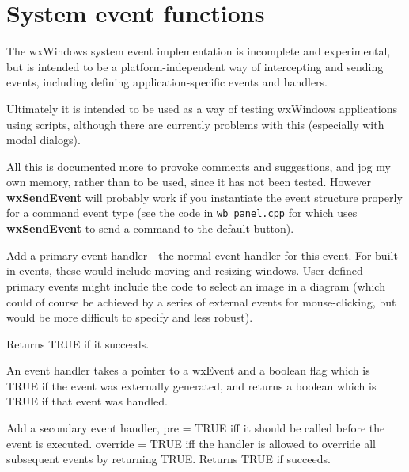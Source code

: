 \section{System event functions}

The wxWindows system event implementation is incomplete and
experimental, but is intended to be a platform-independent way of
intercepting and sending events, including defining
application-specific events and handlers.

Ultimately it is intended to be used as a way of testing wxWindows
applications using scripts, although there are currently
problems with this (especially with modal dialogs).

All this is documented more to provoke comments and suggestions, and
jog my own memory, rather than to be used, since it has not been
tested. However {\bf wxSendEvent} will probably work if you
instantiate the event structure properly for a command event type (see
the code in {\tt wb\_panel.cpp} for \rtfsp
which uses {\bf wxSendEvent} to send a command to the default button).



Add a primary event handler---the normal event handler for this
event. For built-in events, these would include moving and resizing
windows. User-defined primary events might include the code to
select an image in a diagram (which could of course be achieved by a series
of external events for mouse-clicking, but would be more difficult to specify
and less robust).

Returns TRUE if it succeeds.

An event handler takes a pointer to a wxEvent and a boolean flag which is
TRUE if the event was externally generated, and returns a boolean which is
TRUE if that event was handled.



Add a secondary event handler, pre = TRUE iff it should be called before the
event is executed. override = TRUE iff the handler is allowed to override
all subsequent events by returning TRUE. Returns TRUE if succeeds.

